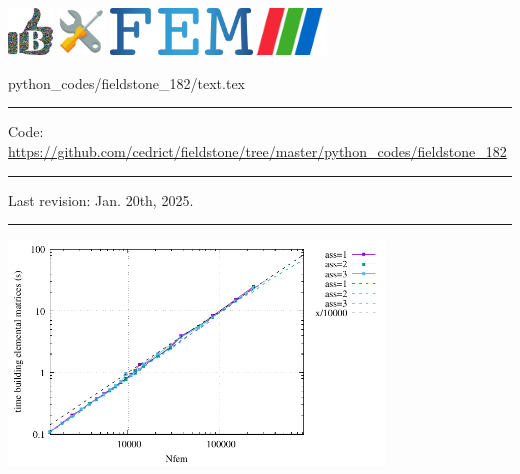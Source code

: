\noindent
\includegraphics[height=1.25cm]{images/pictograms/benchmark}
\includegraphics[height=1.25cm]{images/pictograms/tools}
\includegraphics[height=1.25cm]{images/pictograms/FEM}
\includegraphics[height=1.25cm]{images/pictograms/paraview}


\begin{flushright} {\tiny {\color{gray} python\_codes/fieldstone\_182/text.tex}} \end{flushright}

%

\par\noindent\rule{\textwidth}{0.4pt}

\begin{center}
\inpython
{\small Code: \url{https://github.com/cedrict/fieldstone/tree/master/python_codes/fieldstone_182}}
\end{center}

\par\noindent\rule{\textwidth}{0.4pt}

Last revision: Jan. 20th, 2025.

\par\noindent\rule{\textwidth}{0.4pt}


\begin{center}
\includegraphics[width=10cm]{python_codes/fieldstone_182/RESULTS/times_matrices.pdf}
\end{center}

